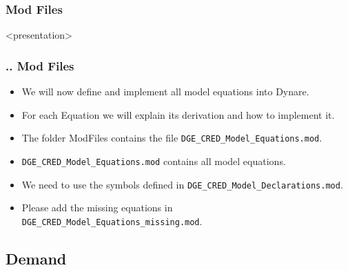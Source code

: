 \documentclass[11pt,aspectratio=169]{beamer}
\begin{document}
\subsubsection{Mod Files}
\begin{frame}<presentation>
\frametitle{{\thesection.\thesubsection.\thesubsubsection} Mod Files}
\begin{itemize}
\item We will now define and implement all model equations into Dynare.
\item For each Equation we will explain its derivation and how to implement it.
\item The folder ModFiles contains the file \texttt{DGE\_CRED\_Model\_Equations.mod}.
\item \texttt{DGE\_CRED\_Model\_Equations.mod} contains all model equations.
\item We need to use the symbols defined in \texttt{DGE\_CRED\_Model\_Declarations.mod}.
\item Please add the missing equations in \texttt{DGE\_CRED\_Model\_Equations\_missing.mod}.
\end{itemize}
\end{frame}


\subsection{Demand}
\end{document}
